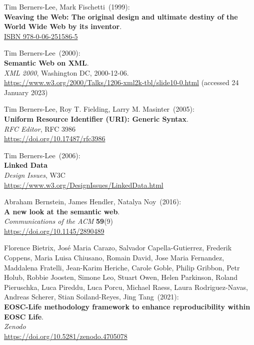\begin{thebibliography}{9}
Tim Berners-Lee, Mark Fischetti~(1999): \\
\textbf{Weaving the {Web}: The original design and ultimate destiny of the {World Wide Web} by its
inventor}.\\
\href{https://identifiers.org/isbn/9780062515865}{ISBN 978-0-06-251586-5}

Tim Berners-Lee~(2000): \\
\textbf{Semantic Web on XML}. \\
\emph{XML 2000}, Washington DC, 2000-12-06. \\
\url{https://www.w3.org/2000/Talks/1206-xml2k-tbl/slide10-0.html}
(accessed 24 January 2023)

Tim Berners-Lee, Roy T. Fielding, Larry M. Masinter~(2005): \\
\textbf{Uniform {Resource Identifier} ({URI}): {Generic Syntax}}.\\
\emph{RFC Editor}, RFC 3986 \\
\url{https://doi.org/10.17487/rfc3986}

Tim Berners-Lee~(2006): \\
\textbf{Linked {Data}}\\
\emph{Design Issues}, W3C \\
\url{https://www.w3.org/DesignIssues/LinkedData.html}

Abraham Bernstein, James Hendler, Natalya Noy~(2016): \\
\textbf{A new look at the semantic web}. \\
\emph{Communications of the ACM} \textbf{59}(9) \\
\url{https://doi.org/10.1145/2890489}

Florence Bietrix, José Maria Carazo, Salvador
Capella-Gutierrez, Frederik Coppens, Maria Luisa Chiusano, Romain David,
Jose Maria Fernandez, Maddalena Fratelli, Jean-Karim Heriche, Carole
Goble, Philip Gribbon, Petr Holub, Robbie Joosten, Simone Leo, Stuart
Owen, Helen Parkinson, Roland Pieruschka, Luca Pireddu, Luca Porcu,
Michael Raess, Laura Rodriguez-Navas, Andreas Scherer, Stian
Soiland-Reyes, Jing Tang~(2021): \\
\textbf{EOSC-Life methodology framework to enhance reproducibility
within EOSC Life}.\\
\emph{Zenodo}\\
\url{https://doi.org/10.5281/zenodo.4705078}


\end{thebibliography}
